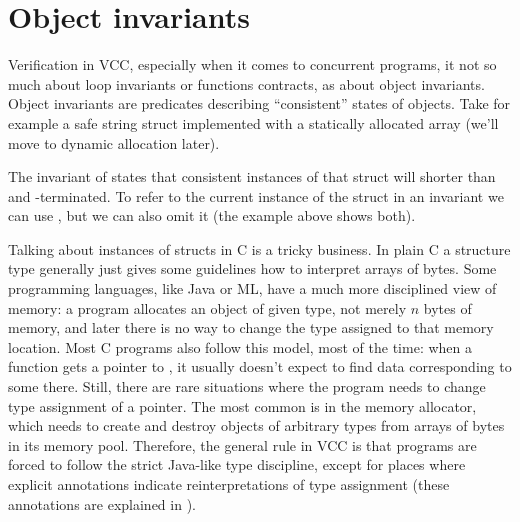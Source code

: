 \section{Object invariants}
\label{sect:invariants}

Verification in VCC, especially when it comes to concurrent programs,
it not so much about loop invariants or functions contracts,
as about object invariants.
Object invariants are predicates describing ``consistent'' states of objects.
Take for example a safe string struct implemented with a
statically allocated array (we'll move to dynamic allocation later).


\noindent
The invariant of  states that consistent instances
of that struct will shorter than  and -terminated.
To refer to the current instance of the struct in an invariant we can use \vcc{\this}, but
we can also omit it (the example above shows both).

Talking about instances of structs in C is a tricky business. 
In plain C a structure type generally just gives some guidelines how to interpret
arrays of bytes.
Some programming languages, like Java or ML, have a much more disciplined
view of memory:
a program allocates an object of given type, not merely $n$ bytes of memory,
and later there is no way to change the type assigned to that memory location.
Most C programs also follow this model, most of the time:
when a function gets a pointer to , it usually doesn't
expect to find data corresponding to some  there.
Still, there are rare situations where the program needs to
change type assignment of a pointer.
The most common is in the memory allocator, which needs to create
and destroy objects of arbitrary types from arrays of bytes
in its memory pool.
Therefore, the general rule in VCC is that programs are forced to
follow the strict Java-like type discipline, except for places
where explicit annotations indicate reinterpretations of type assignment
(these annotations are explained in ).

